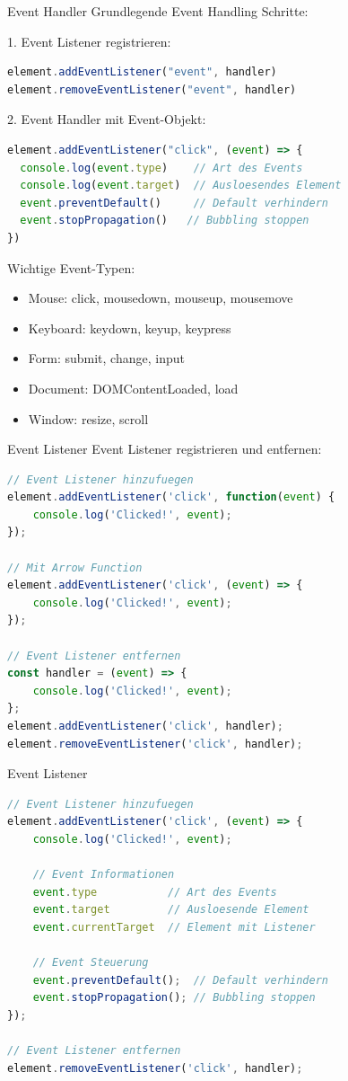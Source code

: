 \begin{KR}{Event Handler}
Grundlegende Event Handling Schritte:

1. Event Listener registrieren:
\begin{lstlisting}[language=JavaScript, style=basesmol]
element.addEventListener("event", handler)
element.removeEventListener("event", handler)
\end{lstlisting}

2. Event Handler mit Event-Objekt:
\begin{lstlisting}[language=JavaScript, style=basesmol]
element.addEventListener("click", (event) => {
  console.log(event.type)    // Art des Events
  console.log(event.target)  // Ausloesendes Element
  event.preventDefault()     // Default verhindern
  event.stopPropagation()   // Bubbling stoppen
})
\end{lstlisting}

Wichtige Event-Typen:
\begin{itemize}
  \item Mouse: click, mousedown, mouseup, mousemove
  \item Keyboard: keydown, keyup, keypress
  \item Form: submit, change, input
  \item Document: DOMContentLoaded, load
  \item Window: resize, scroll
\end{itemize}
\end{KR}

\begin{KR}{Event Listener}
Event Listener registrieren und entfernen:
\begin{lstlisting}[language=JavaScript, style=basesmol]
// Event Listener hinzufuegen
element.addEventListener('click', function(event) {
    console.log('Clicked!', event);
});

// Mit Arrow Function
element.addEventListener('click', (event) => {
    console.log('Clicked!', event);
});

// Event Listener entfernen
const handler = (event) => {
    console.log('Clicked!', event);
};
element.addEventListener('click', handler);
element.removeEventListener('click', handler);
\end{lstlisting}
\end{KR}

\begin{KR}{Event Listener}
\begin{lstlisting}[language=JavaScript, style=basesmol]
// Event Listener hinzufuegen
element.addEventListener('click', (event) => {
    console.log('Clicked!', event);
    
    // Event Informationen
    event.type           // Art des Events
    event.target         // Ausloesende Element
    event.currentTarget  // Element mit Listener
    
    // Event Steuerung
    event.preventDefault();  // Default verhindern
    event.stopPropagation(); // Bubbling stoppen
});

// Event Listener entfernen
element.removeEventListener('click', handler);
\end{lstlisting}
\end{KR}


